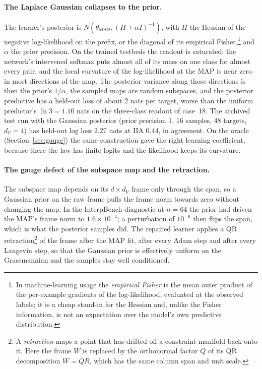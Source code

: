 \documentclass[11pt,a4paper]{article}
\newcommand{\dv}{d_V}
\begin{document}
\paragraph{The Laplace Gaussian collapses to the prior.} The learner's posterior is $N(\theta_{\mathrm{MAP}},(H+\alpha I)^{-1})$, with $H$ the Hessian of the negative log-likelihood on the prefix, or the diagonal of its empirical Fisher,\footnote{In machine-learning usage the \emph{empirical Fisher} is the mean outer product of the per-example gradients of the log-likelihood, evaluated at the observed labels; it is a cheap stand-in for the Hessian and, unlike the Fisher information, is not an expectation over the model's own predictive distribution.} and $\alpha$ the prior precision. On the trained testbeds the readout is saturated: the network's intervened softmax puts almost all of its mass on one class for almost every pair, and the local curvature of the log-likelihood at the MAP is near zero in most directions of the map. The posterior variance along those directions is then the prior's $1/\alpha$, the sampled maps are random subspaces, and the posterior predictive has a held-out loss of about 2 nats per target, worse than the uniform predictor's $\ln 3=1.10$ nats on the three-class readout of case~18. The archived test run with the Gaussian posterior (prior precision 1, 16 samples, 48 targets, $\dv=4$) has held-out log loss 2.27 nats at IIA 0.44, in agreement. On the oracle (Section~\ref{sec:gauge}) the same construction gave the right learning coefficient, because there the law has finite logits and the likelihood keeps its curvature.

\paragraph{The gauge defect of the subspace map and the retraction.} The subspace map depends on its $d\times\dv$ frame only through the span, so a Gaussian prior on the raw frame pulls the frame norm towards zero without changing the map. In the InterpBench diagnostic at $n=64$ the prior had driven the MAP's frame norm to $1.6\times10^{-4}$; a perturbation of $10^{-6}$ then flips the span, which is what the posterior samples did. The repaired learner applies a QR retraction\footnote{A \emph{retraction} maps a point that has drifted off a constraint manifold back onto it. Here the frame $W$ is replaced by the orthonormal factor $Q$ of its QR decomposition $W=QR$, which has the same column span and unit scale.} of the frame after the MAP fit, after every Adam step and after every Langevin step, so that the Gaussian prior is effectively uniform on the Grassmannian and the samples stay well conditioned.
\end{document}
